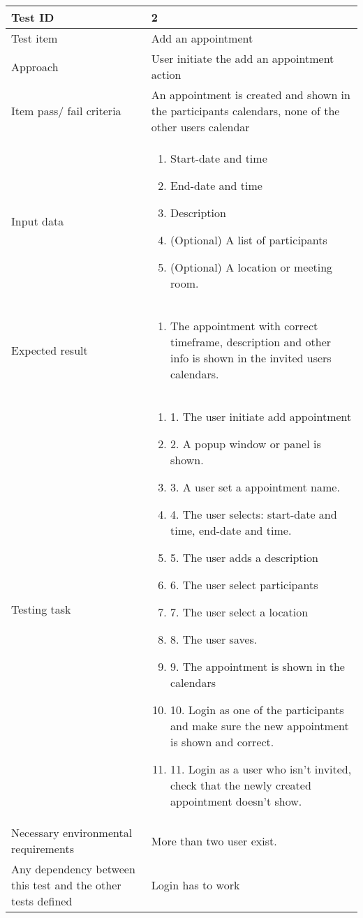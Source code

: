 \documentclass[a4paper, 10pt]{article}
\begin{document}
\begin{tabularx}{\textwidth}{ |X|X| }
\hline
\rowcolor{Gray}
Test ID & 2 \\ \hline
Test item & Add an appointment \\ \hline
Approach & User initiate the add an appointment action \\ \hline
Item pass/ fail criteria & An appointment is created and shown in the participants calendars, none of the other users calendar\\ \hline
Input data &
\begin{enumerate}
\item Start-date and time
\item End-date and time
\item Description
\item (Optional) A list of participants
\item (Optional) A location or meeting room.
\end{enumerate}\\ \hline
Expected result &
\begin{enumerate}
\item The appointment with correct timeframe, description and other info is shown in the invited users calendars.
\end{enumerate} \\ \hline
Testing task &
\begin{enumerate}
\item 1. The user initiate add appointment
\item 2. A popup window or panel is shown.
\item 3. A user set a appointment name.
\item 4. The user selects: start-date and time, end-date and time.
\item 5. The user adds a description
\item 6. The user select participants
\item 7. The user select a location
\item 8. The user saves.
\item 9. The appointment is shown in the calendars
\item 10. Login as one of the participants and make sure the new appointment is shown and correct.
\item 11. Login as a user who isn't invited, check that the newly created appointment doesn't show.
\end{enumerate}	\\ \hline
Necessary environmental requirements & More than two user exist. \\ \hline
Any dependency between this test and the other tests defined & Login has to work \\ \hline

\end{tabularx}
\end{document}
